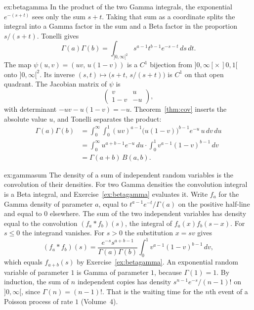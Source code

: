 \begin{solution}{ex:betagamma}
\idea In the product of the two Gamma integrals, the exponential $e^{-(s+t)}$ sees only the sum $s+t$. Taking that sum as a coordinate splits the integral into a Gamma factor in the sum and a Beta factor in the proportion $s/(s+t)$.
\writeup Tonelli gives
\[
\Gamma(a)\Gamma(b)=\int_{]0,\infty[^2}s^{a-1}t^{b-1}e^{-s-t}\,ds\,dt.
\]
The map $\psi(u,v)=(uv,\,u(1-v))$ is a $C^1$ bijection from $]0,\infty[\times\,]0,1[$ onto $]0,\infty[^2$. Its inverse $(s,t)\mapsto\bigl(s+t,\,s/(s+t)\bigr)$ is $C^1$ on that open quadrant. The Jacobian matrix of $\psi$ is
\[
\begin{pmatrix}v&u\\1-v&-u\end{pmatrix},
\]
with determinant $-uv-u(1-v)=-u$. Theorem~\ref{thm:cov} inserts the absolute value $u$, and Tonelli separates the product:
\begin{align*}
\Gamma(a)\Gamma(b)
&=\int_0^\infty\!\!\int_0^1(uv)^{a-1}\bigl(u(1-v)\bigr)^{b-1}e^{-u}\,u\,dv\,du\\
&=\int_0^\infty u^{a+b-1}e^{-u}\,du\cdot\int_0^1 v^{a-1}(1-v)^{b-1}\,dv\\
&=\Gamma(a+b)\,B(a,b).
\end{align*}
\end{solution}

\begin{solution}{ex:gammasum}
\idea The density of a sum of independent random variables is the convolution of their densities. For two Gamma densities the convolution integral is a Beta integral, and Exercise~\ref{ex:betagamma} evaluates it.
\writeup Write $f_a$ for the Gamma density of parameter $a$, equal to $t^{a-1}e^{-t}/\Gamma(a)$ on the positive half-line and equal to $0$ elsewhere. The sum of the two independent variables has density equal to the convolution $(f_a*f_b)(s)$, the integral of $f_a(x)f_b(s-x)$. For $s\le 0$ the integrand vanishes. For $s>0$ the substitution $x=sv$ gives
\[
(f_a*f_b)(s)=\frac{e^{-s}s^{a+b-1}}{\Gamma(a)\Gamma(b)}\int_0^1 v^{a-1}(1-v)^{b-1}\,dv,
\]
which equals $f_{a+b}(s)$ by Exercise~\ref{ex:betagamma}. An exponential random variable of parameter $1$ is Gamma of parameter $1$, because $\Gamma(1)=1$. By induction, the sum of $n$ independent copies has density $s^{n-1}e^{-s}/(n-1)!$ on $]0,\infty[$, since $\Gamma(n)=(n-1)!$. That is the waiting time for the $n$th event of a Poisson process of rate $1$ (Volume~4).
\end{solution}

